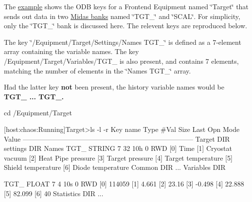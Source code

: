 The \hyperlink{RC_mhttpd_Equipment_page_RC_mhttpd_Equipment_example4}{example} shows the ODB keys for a Frontend Equipment named \char`\"{}Target\char`\"{} that sends out data in two \hyperlink{FE_bank_construction_FE_MIDAS_event_construction}{Midas banks} named \char`\"{}TGT\_\-\char`\"{} and \char`\"{}SCAL\char`\"{}. For simplicity, only the \char`\"{}TGT\_\-\char`\"{} bank is discussed here. The relevent keys are reproduced below.

\par
The key \char`\"{}/Equipment/Target/Settings/Names TGT\_\-\char`\"{} is defined as a 7-\/element array containing the variable names. The key /Equipment/Target/Variables/TGT\_\- is also present, and contains 7 elements, matching the number of elements in the \char`\"{}Names TGT\_\-\char`\"{} array. \par
 Had the latter key {\bfseries not} been present, the history variable names would be {\bfseries TGT\_ ... TGT\_.} \par
 
\begin{DoxyCode}
cd /Equipment/Target

[host:chaos:Running]Target>ls -l -r
Key name                        Type    #Val  Size  Last Opn Mode Value
---------------------------------------------------------------------------
Target                          DIR
    settings                    DIR
        Names TGT_              STRING  7     32    10h  0   RWD  
                                        [0]             Time
                                        [1]             Cryostat vacuum
                                        [2]             Heat Pipe pressure
                                        [3]             Target pressure
                                        [4]             Target temperature
                                        [5]             Shield temperature
                                        [6]             Diode temperature
    Common                      DIR
          ...
    Variables                   DIR

        TGT_                    FLOAT   7     4     10s  0   RWD  
                                        [0]             114059
                                        [1]             4.661
                                        [2]             23.16
                                        [3]             -0.498
                                        [4]             22.888
                                        [5]             82.099
                                        [6]             40
    Statistics                  DIR
          ...
\end{DoxyCode}



